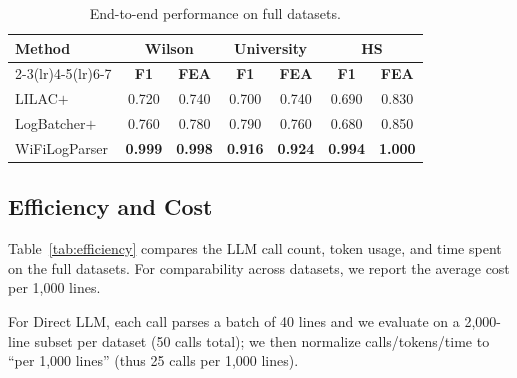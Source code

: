 \documentclass[journal]{IEEEtran}
\begin{document}
\begin{table}[!t]
	\centering
	\caption{End-to-end performance on full datasets.}
	\label{tab:main_full}
	\footnotesize
	\setlength{\tabcolsep}{4pt}
	\begin{tabular}{lcccccc}
		\toprule
		\multirow{2}{*}{\textbf{Method}}        &
		\multicolumn{2}{c}{\textbf{Wilson}}     &
		\multicolumn{2}{c}{\textbf{University}} &
		\multicolumn{2}{c}{\textbf{HS}}                                                                                                               \\
		\cmidrule(lr){2-3}\cmidrule(lr){4-5}\cmidrule(lr){6-7}
		                                        & \textbf{F1}    & \textbf{FEA}   & \textbf{F1}    & \textbf{FEA}   & \textbf{F1}    & \textbf{FEA}   \\
		\midrule
		LILAC$+$                                & 0.720          & 0.740          & 0.700          & 0.740          & 0.690          & 0.830          \\
		LogBatcher$+$                           & 0.760          & 0.780          & 0.790          & 0.760          & 0.680          & 0.850          \\
		WiFiLogParser                           & \textbf{0.999} & \textbf{0.998} & \textbf{0.916} & \textbf{0.924} & \textbf{0.994} & \textbf{1.000} \\
		\bottomrule
	\end{tabular}
\end{table}


\subsection{Efficiency and Cost}
\label{subsec:efficiency}
Table~\ref{tab:efficiency} compares the LLM call count, token usage, and time spent on the full datasets. For comparability across datasets, we report the average cost per 1,000 lines.

For Direct LLM, each call parses a batch of 40 lines and we evaluate on a 2,000-line subset per dataset (50 calls total); we then normalize calls/tokens/time to ``per 1,000 lines'' (thus 25 calls per 1,000 lines).
\end{document}
